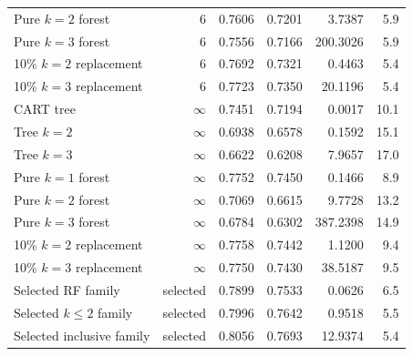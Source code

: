 \begin{table}[t]
\begin{tabular}{@{}lrrrrr@{}}
Pure $k=2$ forest & 6 & 0.7606 & 0.7201 & 3.7387 & 5.9 \\
Pure $k=3$ forest & 6 & 0.7556 & 0.7166 & 200.3026 & 5.9 \\
10\% $k=2$ replacement & 6 & 0.7692 & 0.7321 & 0.4463 & 5.4 \\
10\% $k=3$ replacement & 6 & 0.7723 & 0.7350 & 20.1196 & 5.4 \\
\addlinespace
CART tree & $\infty$ & 0.7451 & 0.7194 & 0.0017 & 10.1 \\
Tree $k=2$ & $\infty$ & 0.6938 & 0.6578 & 0.1592 & 15.1 \\
Tree $k=3$ & $\infty$ & 0.6622 & 0.6208 & 7.9657 & 17.0 \\
Pure $k=1$ forest & $\infty$ & 0.7752 & 0.7450 & 0.1466 & 8.9 \\
Pure $k=2$ forest & $\infty$ & 0.7069 & 0.6615 & 9.7728 & 13.2 \\
Pure $k=3$ forest & $\infty$ & 0.6784 & 0.6302 & 387.2398 & 14.9 \\
10\% $k=2$ replacement & $\infty$ & 0.7758 & 0.7442 & 1.1200 & 9.4 \\
10\% $k=3$ replacement & $\infty$ & 0.7750 & 0.7430 & 38.5187 & 9.5 \\
\midrule
Selected RF family & selected & 0.7899 & 0.7533 & 0.0626 & 6.5 \\
Selected $k\leq2$ family & selected & 0.7996 & 0.7642 & 0.9518 & 5.5 \\
Selected inclusive family & selected & 0.8056 & 0.7693 & 12.9374 & 5.4 \\
\bottomrule
\end{tabular}
\end{table}
